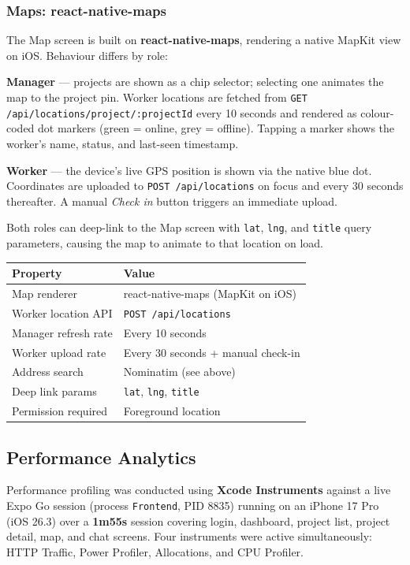 \documentclass[12pt,a4paper]{article}
\begin{document}
\subsubsection{Maps: react-native-maps}

The Map screen is built on \textbf{react-native-maps}, rendering a native MapKit view on iOS. Behaviour differs by role:

\textbf{Manager} --- projects are shown as a chip selector; selecting one animates the map to the project pin. Worker locations are fetched from \texttt{GET /api/locations/project/:projectId} every 10 seconds and rendered as colour-coded dot markers (green = online, grey = offline). Tapping a marker shows the worker's name, status, and last-seen timestamp.

\textbf{Worker} --- the device's live GPS position is shown via the native blue dot. Coordinates are uploaded to \texttt{POST /api/locations} on focus and every 30 seconds thereafter. A manual \textit{Check in} button triggers an immediate upload.

Both roles can deep-link to the Map screen with \texttt{lat}, \texttt{lng}, and \texttt{title} query parameters, causing the map to animate to that location on load.

\begin{tabular}{ll}
\toprule
\textbf{Property} & \textbf{Value} \\
\midrule
Map renderer          & react-native-maps (MapKit on iOS) \\
Worker location API   & \texttt{POST /api/locations} \\
Manager refresh rate  & Every 10 seconds \\
Worker upload rate    & Every 30 seconds + manual check-in \\
Address search        & Nominatim (see above) \\
Deep link params      & \texttt{lat}, \texttt{lng}, \texttt{title} \\
Permission required   & Foreground location \\
\bottomrule
\end{tabular}

\subsection{Performance Analytics}

Performance profiling was conducted using \textbf{Xcode Instruments} against a live Expo Go session (process \texttt{Frontend}, PID 8835) running on an iPhone 17 Pro (iOS 26.3) over a \textbf{1m55s} session covering login, dashboard, project list, project detail, map, and chat screens. Four instruments were active simultaneously: HTTP Traffic, Power Profiler, Allocations, and CPU Profiler.
\end{document}
